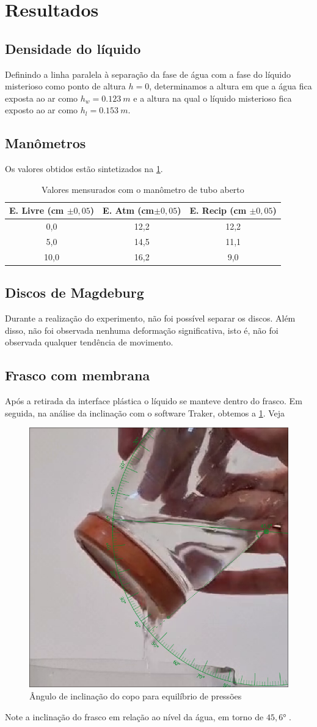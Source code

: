 \section{Resultados}
\subsection{Densidade do líquido}
Definindo a linha paralela à separação da fase de água com a fase do líquido
misterioso como ponto de altura \(h = 0\), determinamos a altura em que a
água fica exposta ao ar como \(h_w = \qty{0,123}{m}\) e a altura na qual o
líquido misterioso fica exposto ao ar como \(h_l = \qty{0,153}{m}\). 

\subsection{Manômetros}
Os valores obtidos estão sintetizados na \cref{tab_man}.

\begin{table}[H]
    \centering
    \begin{tabular}{c | c | c}
        \hline
        \textbf{E. Livre (cm \(\pm 0,05\))} & \textbf{E. Atm (cm\(\pm 0,05\))} & \textbf{E. Recip (cm \(\pm0,05\))}\\
        \hline
        0,0 & 12,2 & 12,2\\
        \hline
        5,0 & 14,5 & 11,1\\
        \hline
        10,0 & 16,2 & 9,0\\
        \hline
    \end{tabular}
    \caption{Valores mensurados com o manômetro de tubo aberto}
    \label{tab_man}
\end{table}

\subsection{Discos de Magdeburg}
Durante a realização do experimento, não foi possível separar os discos. Além
disso, não foi observada nenhuma deformação significativa, isto é, não foi
observada qualquer tendência de movimento. 

\subsection{Frasco com membrana}
Após a retirada da interface plástica o líquido se manteve dentro do frasco. Em
seguida, na análise da inclinação com o software Traker, obtemos a \cref{copo.png}. Veja
\begin{figure}[H]
    \centering
    \includegraphics[width=.35\linewidth]{fig/copo.png}
    \caption{Ângulo de inclinação do copo para equilíbrio de pressões}
    \label{copo.png}
\end{figure}

Note a inclinação do frasco em relação ao nível da água, em torno de \( 45,6 \)°
.

